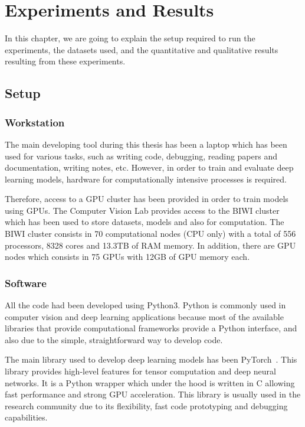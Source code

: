 
\chapter{Experiments and Results}
\label{cha:experimentsandresults}

In this chapter, we are going to explain the setup required to run the experiments,
the datasets used, and the quantitative and qualitative results resulting from these experiments.

\section{Setup}
\subsection{Workstation}

The main developing tool during this thesis has been a laptop which has been used for various tasks, such as writing code, debugging, reading papers and documentation, writing notes, etc.
However, in order to train and evaluate deep learning models, hardware for computationally intensive processes is required.

Therefore, access to a GPU cluster has been provided in order to train models using GPUs.
The Computer Vision Lab provides access to the BIWI cluster which has been used to store datasets, models and also for computation.
The BIWI cluster consists in 70 computational nodes (CPU only) with a total of 556 processors, 8328 cores and 13.3TB of RAM memory.
In addition, there are GPU nodes which consists in 75 GPUs with 12GB of GPU memory each.

\subsection{Software}

All the code had been developed using Python3.
Python is commonly used in computer vision and deep learning applications because most of the available libraries that provide computational frameworks provide a Python interface, and also due to the simple, straightforward way to develop code.

The main library used to develop deep learning models has been PyTorch~\pytorch{}.
This library provides high-level features for tensor computation and deep neural networks.
It is a Python wrapper which under the hood is written in C allowing fast performance and strong GPU acceleration.
This library is usually used in the research community due to its flexibility, fast code prototyping and debugging capabilities.

